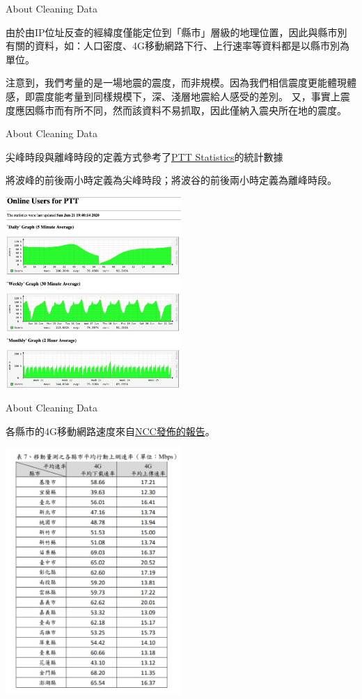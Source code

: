 \begin{frame}[fragile]{About Cleaning Data}

由於由IP位址反查的經緯度僅能定位到「縣市」層級的地理位置，因此與縣市別有關的資料，如：人口密度、4G移動網路下行、上行速率等資料都是以縣市別為單位。

注意到，我們考量的是一場地震的震度，而非規模。因為我們相信震度更能體現體感，即震度能考量到同樣規模下，深、淺層地震給人感受的差別。
又，事實上震度應因縣市而有所不同，然而該資料不易抓取，因此僅納入震央所在地的震度。

\end{frame}

\begin{frame}[fragile]{About Cleaning Data}

尖峰時段與離峰時段的定義方式參考了{\color{blue}\href{https://www.ptt.cc/statistics.html}{PTT Statistics}}的統計數據

將波峰的前後兩小時定義為尖峰時段；將波谷的前後兩小時定義為離峰時段。

	\includegraphics[width=0.5\textwidth]{Images/peak.png}

\end{frame}


\begin{frame}[fragile]{About Cleaning Data}

各縣市的4G移動網路速度來自{\color{blue}\href{https://www.inside.com.tw/article/19538-NCC-4G-speed-report-2019}{NCC發佈的報告}}。

	\includegraphics[width=0.5\textwidth]{Images/4g.jpg}

\end{frame}


